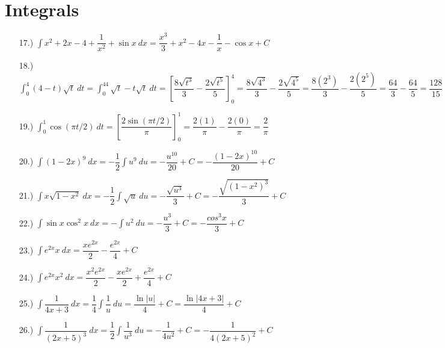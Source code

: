 \documentclass[12pt]{article}
\newcommand{\bracks}[1]{\left[#1\right]}
\newcommand{\lint}{\displaystyle\int}
\begin{document}
\section*{Integrals}
\begin{itemize}
    \item [17.)] $\lint x^2+2x-4+\dfrac{1}{x^2}+\sin x\ dx=\dfrac{x^3}{3}+x^2-4x-\dfrac{1}{x}-\cos x+C$

    \item [18.)] $\lint_0^4(4-t)\sqrt{t}\ dt=\lint_0^44\sqrt{t}-t\sqrt{t}\ dt=\bracks{\dfrac{8\sqrt{t^3}}{3}-\dfrac{2\sqrt{t^5}}{5}}_0^4=\dfrac{8\sqrt{4^3}}{3}-\dfrac{2\sqrt{4^5}}{5}=\dfrac{8(2^3)}{3}-\dfrac{2(2^5)}{5}=\dfrac{64}{3}-\dfrac{64}{5}=\dfrac{128}{15}$

    \item [19.)] $\lint_0^1\cos(\pi t/2)\ dt=\bracks{\dfrac{2\sin(\pi t/2)}{\pi}}_0^1=\dfrac{2(1)}{\pi}-\dfrac{2(0)}{\pi}=\dfrac{2}{\pi}$

    \item [20.)] $\lint(1-2x)^9\ dx=-\dfrac{1}{2}\lint u^9\ du=-\dfrac{u^{10}}{20}+C=-\dfrac{(1-2x)^{10}}{20}+C$

    \item [21.)] $\lint x\sqrt{1-x^2}\ dx=-\dfrac{1}{2}\lint\sqrt{u}\ du=-\dfrac{\sqrt{u^3}}{3}+C=-\dfrac{\sqrt{(1-x^2)^3}}{3}+C$

    \item [22.)] $\lint\sin x\cos^2x\ dx=-\lint u^2\ du=-\dfrac{u^3}{3}+C=-\dfrac{cos^3x}{3}+C$

    \item [23.)] $\lint e^{2x}x\ dx=\dfrac{xe^{2x}}{2}-\dfrac{e^{2x}}{4}+C$

    \item [24.)] $\lint e^{2x}x^2\ dx=\dfrac{x^2e^{2x}}{2}-\dfrac{xe^{2x}}{2}+\dfrac{e^{2x}}{4}+C$

    \item [25.)] $\lint\dfrac{1}{4x+3}\ dx=\dfrac{1}{4}\lint\dfrac{1}{u}\ du=\dfrac{\ln\vert u\vert}{4}+C=\dfrac{\ln\vert4x+3\vert}{4}+C$

    \item [26.)] $\lint\dfrac{1}{(2x+5)^3}\ dx=\dfrac{1}{2}\lint\dfrac{1}{u^3}\ du=-\dfrac{1}{4u^2}+C=-\dfrac{1}{4(2x+5)^2}+C$
\end{itemize}
\end{document}
